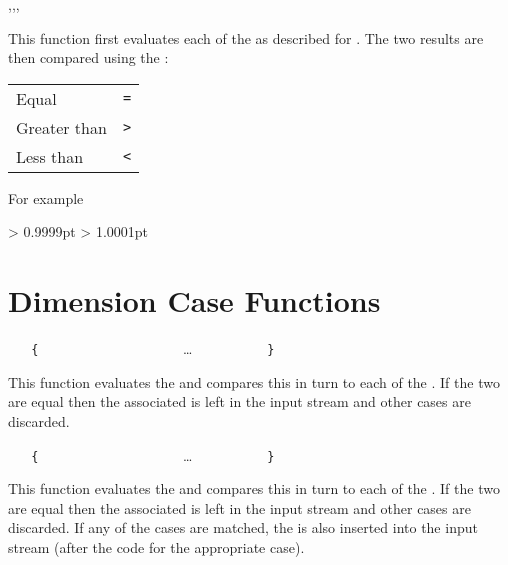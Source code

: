 \documentclass[oneside]{book}
\begin{document}
\begin{function}{\DimCompare,\DimCompareT,\DimCompareF,\DimCompareTF}
\begin{syntax}
   
    
    
     
\end{syntax}
This function first evaluates each of the 
as described for . The two results are then
compared using the :\par
{\centering
\begin{tabular}{ll}
Equal        & \verb|=| \\
Greater than & \verb|>| \\
Less than    & \verb|<| \\
\end{tabular}\par}
For example
\begin{demohigh}
\DimCompareTF {1pt} > {0.9999pt} {} {}
\DimCompareTF {1pt} > {1.0001pt} {} {}
\end{demohigh}
\end{function}

\section{Dimension Case Functions}

\begin{function}{\DimCase}
\begin{syntax}
 
~ ~ \verb|{|
~ ~ ~ ~  
~ ~ ~ ~   
~ ~ ~ ~ \ldots
~ ~ ~ ~  
~ ~ \verb|}|
\end{syntax}
This function evaluates the  and
compares this in turn to each of the
. If the two are equal then the
associated  is left in the input stream
and other cases are discarded.
\end{function}

\begin{function}{\DimCaseT}
\begin{syntax}
 
~ ~ \verb|{|
~ ~ ~ ~  
~ ~ ~ ~   
~ ~ ~ ~ \ldots
~ ~ ~ ~  
~ ~ \verb|}|
~ ~ 
\end{syntax}
This function evaluates the  and
compares this in turn to each of the
. If the two are equal then the
associated  is left in the input stream
and other cases are discarded. If any of the
cases are matched, the  is also inserted into the
input stream (after the code for the appropriate case).
\end{function}
\end{document}
